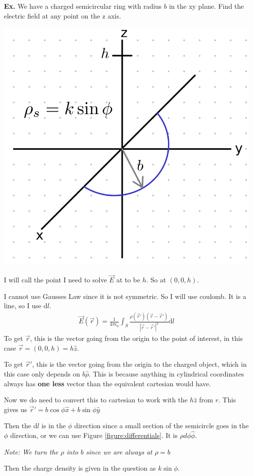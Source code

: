 \documentclass[12pt,letterpaper]{article} \usepackage{amsmath} \usepackage{graphicx} \usepackage[margin=1in]{geometry} \usepackage{longtable}  \usepackage{amssymb}
\begin{document}
	\begin{mdframed}
		\textbf{Ex. }We have a charged semicircular ring with radius $b$ in the xy plane. Find the electric field at any point on the z axis.
		\begin{center}
			\includegraphics[width=0.4\linewidth]{ex-coulomb}
		\end{center}
		
		I will call the point I need to solve $\vec E$ at to be $h$. So at $(0,0,h)$.
		
		I cannot use Gausses Law since it is not symmetric. So I will use coulomb. It is a line, so I use $\mathrm d l$.
		\begin{align*}
			\vec E (\vec r) = \frac{1}{4\pi \epsilon_0} \int_S \frac{\rho(\vec r\prime)(\vec r - \vec r\prime)}{|\vec r - \vec r\prime | ^3}\mathrm d l
		\end{align*}
		To get $\vec r$, this is the vector going from the origin to the point of interest, in this case $\vec r = (0,0,h) = h\hat z$.
		
		To get $\vec r\prime$, this is the vector going from the origin to the charged object, which in this case only depends on $b \hat \rho$. This is because anything in cylindrical coordinates always has \textbf{one less} vector than the equivalent cartesian would have. 
		
		Now we do need to convert this to cartesian to work with the $h\hat z$ from $r$. This gives us $\vec r \prime = b\cos \phi \hat x + b\sin \phi \hat y$
		
		Then the $\mathrm d l$ is in the $\phi$ direction since a small section of the semicircle goes in the $\phi$ direction, or we can use Figure \ref{figure:differentials}. It is $\rho d\phi\hat\phi$.
		
		\textit{Note: We turn the $\rho$ into $b$ since we are always at $\rho = b$}
		
		Then the charge density is given in the question as $k\sin \phi$. 
		

\end{mdframed}
\end{document}
